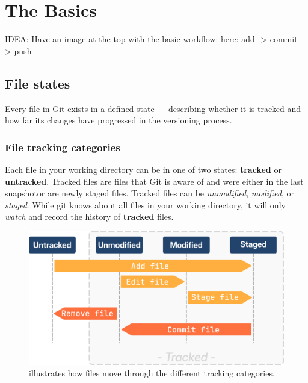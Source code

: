 \chapter{The Basics}
\chapteroverlay
\chapterunderlay

IDEA: Have an image at the top with the basic workflow:
here: add -> commit -> push
\section{File states}
Every file in Git exists in a defined state — describing whether it is tracked and how far its changes have progressed in the versioning process.

\subsection{File tracking categories}
Each file in your working directory can be in one of two states: \textbf{tracked} or \textbf{untracked}. Tracked files are files that Git is aware of and were either in the last snapshot\footnotemark[1] or are newly staged files.
Tracked files can be \textit{unmodified}, \textit{modified}, or \textit{staged}. \newline
While git knows about all files in your working directory, it will only \textit{watch} and record the history of \textbf{tracked} files.

\begin{figure}[H]
\centering
    \includegraphics[scale=1]{Images/workingTree_tracked.png}
    \caption{illustrates how files move through the different tracking categories.}
\end{figure}

